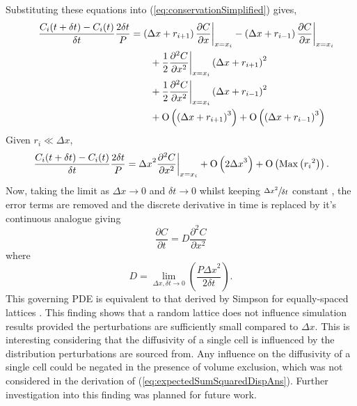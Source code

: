 \documentclass[11pt,titlepage,a4paper]{article}
\newcommand{\BigO}[1]{\ensuremath{\operatorname{O}\left(#1\right)}}
\begin{document}
		  	Substituting these equations into (\ref{eq:conservationSimplified}) gives, 
		  	\begin{align*}
			  	\phantom{\frac{C(x_i, t + \delta t) - C(x_i, t)}{\delta t} \frac{2 \delta t}{P}}
			  	&\begin{aligned}
			    	\mathllap{\frac{C_i(t + \delta t) - C_i(t)}{\delta t} \frac{2 \delta t}{P}} &=  \left(\Delta x + r_{i+1} \right) \frac{\partial C}{\partial x}\bigg|_{x=x_i} - \left(\Delta x + r_{i-1} \right) \frac{\partial C}{\partial x}\bigg|_{x=x_i} \\
			    	&\qquad + \frac{1}{2} \frac{\partial^2 C}{\partial x^2}\bigg|_{x=x_i} \left (\Delta x + r_{i+1} \right)^2 \\
			    	&\qquad + \frac{1}{2} \frac{\partial^2 C}{\partial x^2}\bigg|_{x=x_i} \left (\Delta x + r_{i-1} \right)^2 \\
			    	&\qquad + \BigO{\left(\Delta x + r_{i+1} \right)^3} + \BigO{\left(\Delta x + r_{i-1} \right)^3}
			    \end{aligned}
		  	\end{align*}
		  	Given $r_i \ll \Delta x$,
		  	\begin{align*}
			  	\phantom{\frac{C(x_i, t + \delta t) - C(x_i, t)}{\delta t} \frac{2 \delta t}{P}}
			  	&\begin{aligned}
			    	\mathllap{\frac{C_i(t + \delta t) - C_i(t)}{\delta t} \frac{2 \delta t}{P}} &= {\Delta x}^2 \frac{\partial^2 C}{\partial x^2}\bigg|_{x=x_i} + \BigO{2 {\Delta x}^3} + \BigO{\text{Max} \left({r_i}^2 \right)}.
			    \end{aligned}
		  	\end{align*}
		  	Now, taking the limit as $\Delta x \to 0$ and $\delta t \to 0$ whilst keeping $\sfrac{{\Delta x}^2}{\delta t}$ constant \cite{codling2008random}, the error terms are removed and the discrete derivative in time is replaced by it's continuous analogue giving
		  	\begin{equation*}
		  		\frac{\partial C}{\partial t} = D \frac{\partial^2 C}{\partial x^2}
		  	\end{equation*}
		  	where 
		  	\begin{equation*}
		  		D = \lim_{\Delta x, \delta t \to 0} \left( \frac{P {\Delta x}^2}{2 \delta t}\right).
		  	\end{equation*}
		  	This governing PDE is equivalent to that derived by Simpson for equally-spaced lattices \cite{simpson2009diffusing}. This finding shows that a random lattice does not influence simulation results provided the perturbations are sufficiently small compared to $\Delta x$. This is interesting considering that the diffusivity of a single cell is influenced by the distribution perturbations are sourced from. Any influence on the diffusivity of a single cell could be negated in the presence of volume exclusion, which was not considered in the derivation of (\ref{eq:expectedSumSquaredDispAns}). Further investigation into this finding was planned for future work.
\end{document}
